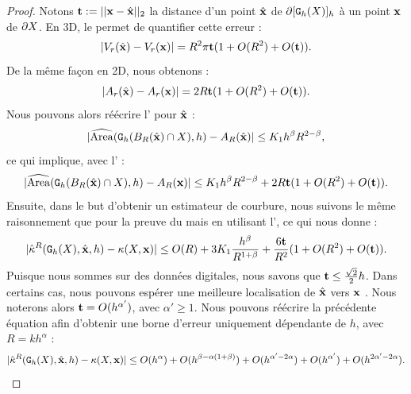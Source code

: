 \begin{proof}
%
Notons $\vt \EqDef ||\vx-\vxH||_2$ la distance d'un point $\vxH$ de
$\Bd{\Body{\DSh}{h}}$ à un point $\vx$ de $\dS$. En 3D, le
 permet de quantifier cette erreur :
%
\begin{equation}\label{eq:volume-shift-error}
  | V_r(\vxH) - V_r(\vx) | = R^2 \pi \vt (1 + O(R^2)+O(\vt)).
\end{equation}
%
De la même façon en 2D, nous obtenons :
%
\begin{equation}\label{eq:area-shift-error}
  | A_r(\vxH) - A_r(\vx) | = 2R \vt (1 + O(R^2)+O(\vt)).
\end{equation}
%
Nous pouvons alors réécrire l'
pour $\vxH$ :
%
\begin{equation}
  | \AreaC(\DigF{\Ball{R}{\vxH} \cap \Shape}{h}, h) - A_R(\vxH) | \le K_1 h^\beta R^{2-\beta},
\end{equation}
%
ce qui implique, avec l' :
%
\begin{equation}\label{eq:shift-B-R-error-bound-2D}
  | \AreaC(\DigF{\Ball{R}{\vxH} \cap \Shape}{h}, h) - A_R(\vx) |  \le K_1 h^\beta R^{2-\beta} +  2 R \vt (1 + O(R^2) + O(\vt)).
\end{equation}
%
Ensuite, dans le but d'obtenir un estimateur de courbure, nous suivons le même
raisonnement que pour la preuve du  mais en
utilisant l', ce qui nous donne :
%
\begin{equation}\label{eq:shift-curvhat-error-bound-2D}
  | \CurvH{R}(\DSh,\vxH,h) - \Curv(\Shape,\vx) | \le O(R) + 3 K_1 \frac{h^\beta}{R^{1+\beta}} + \frac{6 \vt}{R^2}(1 + O(R^2) + O(\vt)).
\end{equation}
%
Puisque nous sommes sur des données digitales, nous savons que $\vt \le
\frac{\sqrt{2}}{2}h$. Dans certains cas, nous pouvons espérer une meilleure
localisation de $\vxH$ vers $\vx$ \cite{deVieilleville2006}. Nous noterons alors
$\vt = O(h^{\alpha'})$, avec $\alpha' \ge 1$. Nous pouvons réécrire la
précédente équation afin d'obtenir une borne d'erreur uniquement dépendante de
$h$, avec $R=kh^{\alpha}$ :
%
\begin{equation} \label{eq:shift-curvhat-error-bound-h-only}
  | \CurvH{R}(\DSh,\vxH,h) - \Curv(\Shape,\vx) |
  \le O(h^\alpha) + O(h^{\beta-\alpha(1+\beta)}) + O(h^{\alpha'-2\alpha})
    + O(h^{\alpha'}) + O(h^{2\alpha'-2\alpha}).
\end{equation}

\end{proof}
